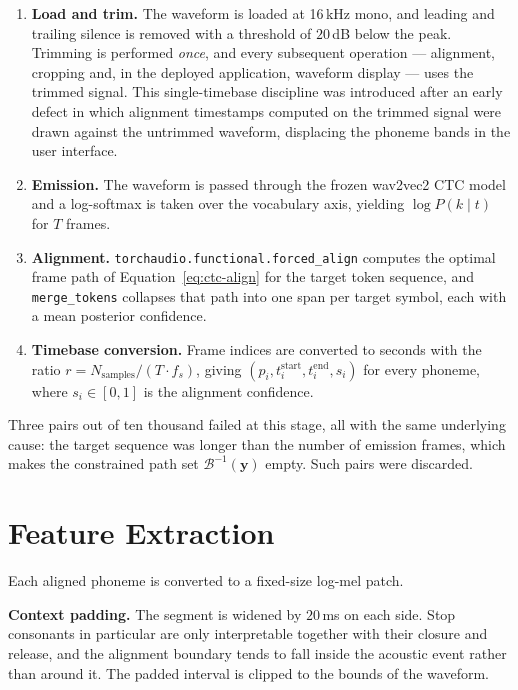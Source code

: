 \begin{enumerate}[leftmargin=*]
  \item \textbf{Load and trim.} The waveform is loaded at 16\,kHz mono, and
        leading and trailing silence is removed with a threshold of
        $20$\,dB below the peak. Trimming is performed \emph{once}, and every
        subsequent operation --- alignment, cropping and, in the deployed
        application, waveform display --- uses the trimmed signal. This
        single-timebase discipline was introduced after an early defect in
        which alignment timestamps computed on the trimmed signal were drawn
        against the untrimmed waveform, displacing the phoneme bands in the
        user interface.
  \item \textbf{Emission.} The waveform is passed through the frozen wav2vec2
        CTC model and a log-softmax is taken over the vocabulary axis, yielding
        $\log P(k \mid t)$ for $T$ frames.
  \item \textbf{Alignment.} \texttt{torchaudio.functional.forced\_align}
        computes the optimal frame path of Equation~\eqref{eq:ctc-align} for the
        target token sequence, and \texttt{merge\_tokens} collapses that path
        into one span per target symbol, each with a mean posterior confidence.
  \item \textbf{Timebase conversion.} Frame indices are converted to seconds
        with the ratio
        $r = N_{\text{samples}} / (T \cdot f_s)$,
        giving $(p_i, t^{\text{start}}_i, t^{\text{end}}_i, s_i)$ for every
        phoneme, where $s_i \in [0,1]$ is the alignment confidence.
\end{enumerate}

Three pairs out of ten thousand failed at this stage, all with the same
underlying cause: the target sequence was longer than the number of emission
frames, which makes the constrained path set $\mathcal{B}^{-1}(\mathbf{y})$
empty. Such pairs were discarded.

\section{Feature Extraction}
\label{sec:features}

Each aligned phoneme is converted to a fixed-size log-mel patch.

\textbf{Context padding.} The segment is widened by $20$\,ms on each side. Stop
consonants in particular are only interpretable together with their closure and
release, and the alignment boundary tends to fall inside the acoustic event
rather than around it. The padded interval is clipped to the bounds of the
waveform.

